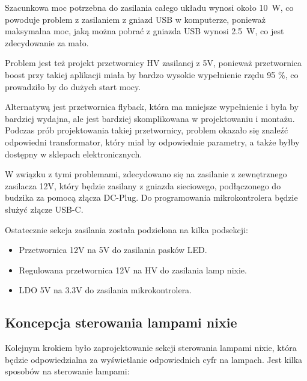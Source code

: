 \documentclass[../main.tex]{subfiles}
\begin{document}
Szacunkowa moc potrzebna do zasilania całego układu wynosi około \SI{10}{\watt}, co powoduje problem z zasilaniem z gniazd USB w komputerze,
ponieważ maksymalna moc, jaką można pobrać z gniazda USB wynosi \SI{2.5}{\watt}, co jest zdecydowanie za mało.

Problem jest też projekt przetwornicy HV zasilanej z 5V, ponieważ przetwornica boost przy takiej aplikacji miała by bardzo wysokie wypełnienie rzędu 95 \%,
co prowadziło by do dużych start mocy.

Alternatywą jest przetwornica flyback, która ma mniejsze wypełnienie i była by bardziej wydajna, ale jest bardziej skomplikowana w projektowaniu i montażu.
Podczas prób projektowania takiej przetwornicy, problem okazało się znaleźć odpowiedni transformator, który miał by odpowiednie parametry,
a także byłby dostępny w sklepach elektronicznych.

W związku z tymi problemami, zdecydowano się na zasilanie z zewnętrznego zasilacza 12V, który będzie zasilany z gniazda sieciowego, 
podłączonego do budzika za pomocą złącza DC-Plug. Do programowania mikrokontrolera będzie służyć złącze USB-C.

Ostatecznie sekcja zasilania została podzielona na kilka podsekcji:
\begin{itemize}
    \item Przetwornica 12V na 5V do zasilania pasków LED.
    \item Regulowana przetwornica 12V na HV do zasilania lamp nixie.
    \item LDO 5V na 3.3V do zasilania mikrokontrolera.
\end{itemize}

\subsection{Koncepcja sterowania lampami nixie}
Kolejnym krokiem było zaprojektowanie sekcji sterowania lampami nixie, która będzie odpowiedzialna za wyświetlanie odpowiednich cyfr na lampach.
Jest kilka sposobów na sterowanie lampami:
\end{document}
